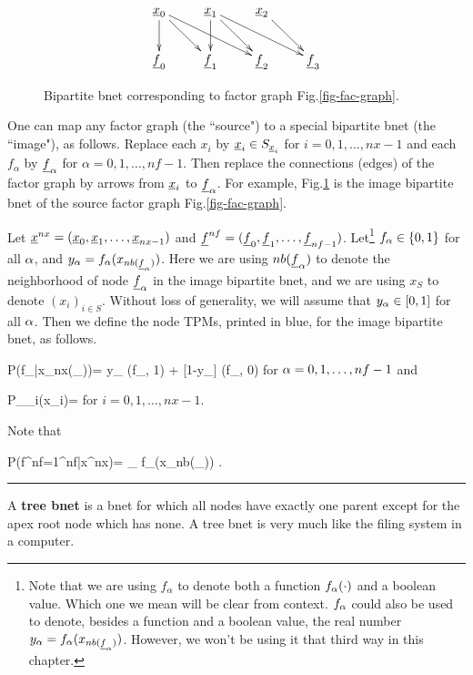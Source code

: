 \begin{figure}[h!]
\centering
$$\xymatrix{
\rvx_0\ar[d]\ar[dr]\ar[drr]
&\rvx_1\ar[d]\ar[dr]\ar[drr]
&\rvx_2\ar[dr]
\\
\rvf_0&\rvf_1&\rvf_2&\rvf_3
}$$
\caption{Bipartite bnet
corresponding to factor
graph Fig.\ref{fig-fac-graph}.}
\label{fig-bip-bnet}
\end{figure}

One
can map
any factor graph (the ``source")
to a special bipartite bnet (the ``image"),
as follows.
Replace each $x_i$ by ${\underline{x}}_i\in S_{{\underline{x}}_i}$
for $i=0,1, \ldots, nx-1$
 and each
 $f_\alpha$ by ${\underline{f}}_\alpha$
for $\alpha=0, 1, \ldots, nf-1$.
Then replace
the connections (edges)
of the factor graph
by arrows from ${\underline{x}}_i$ to
${\underline{f}}_\alpha$. For example,
Fig.\ref{fig-bip-bnet}
is the image bipartite bnet of the source factor
graph Fig.\ref{fig-fac-graph}.


Let ${\underline{x}}^{nx}=
({\underline{x}}_0, {\underline{x}}_1, \ldots, {\underline{x}}_{nx-1})$
and
${\underline{f}}^{nf}=
({\underline{f}}_0, {\underline{f}}_1, \ldots, {\underline{f}}_{nf-1})$.
Let\footnote{
Note that we are using
$f_\alpha$
to denote both a function
$f_\alpha(\cdot)$  and a boolean
value. Which one we mean
will be clear from context.
$f_\alpha$ could also be used to
denote, besides a function and a boolean value,
the real number
$y_\alpha=f_\alpha(x_{nb({\underline{f}}_\alpha)})$.
However, we won't be using it that third way
in this chapter.}
$f_\alpha\in \{0,1\}$ for all $\alpha$,
and $y_\alpha=
f_\alpha(x_{nb({\underline{f}}_\alpha)})$.
Here we are using $nb({\underline{f}}_\alpha)$
to denote  the neighborhood
of node ${\underline{f}}_\alpha$
in the image bipartite bnet,
and we are using $x_S$ to denote
$(x_i)_{i\in S}$.
Without loss of
generality,
we will assume
that $y_\alpha\in[0,1]$ for all $\alpha$.
Then we define the node TPMs, printed
in blue, for the
image bipartite bnet, 
as follows.




\beq\color{blue}
P(f_\alpha|x_{nx(\rvf_\alpha)})=
y_\alp
\delta(f_\alp, 1)
+
[1-y_\alp]
\delta(f_\alp, 0)
\;
\eeq
for $\alpha=0, 1, \ldots , nf-1$
and

\beq\color{blue}
P_{\rvx_i}(x_i)= 
\eeq
for $i=0, 1, \ldots, nx-1$.

Note that

\beq
P(f^{nf}=1^{nf}|x^{nx})=
\prod_\alpha
f_\alpha(x_{nb(\rvf_\alpha)})
\;.
\eeq

\hrule
A {\bf tree bnet}
is a bnet for which all
nodes have exactly
one parent except
for the apex root
node which has none.
A tree bnet
is very much like
the filing system
in a computer.

